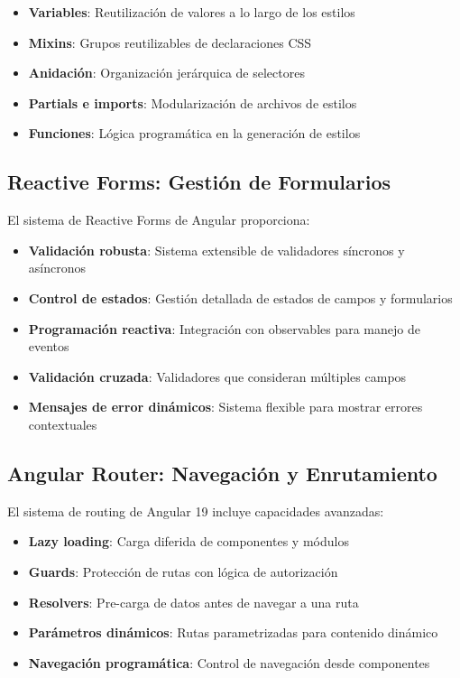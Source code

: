 \begin{itemize}
    \item \textbf{Variables}: Reutilización de valores a lo largo de los estilos
    \item \textbf{Mixins}: Grupos reutilizables de declaraciones CSS
    \item \textbf{Anidación}: Organización jerárquica de selectores
    \item \textbf{Partials e imports}: Modularización de archivos de estilos
    \item \textbf{Funciones}: Lógica programática en la generación de estilos
\end{itemize}

\subsection{Reactive Forms: Gestión de Formularios}

El sistema de Reactive Forms de Angular proporciona:

\begin{itemize}
    \item \textbf{Validación robusta}: Sistema extensible de validadores síncronos y asíncronos
    \item \textbf{Control de estados}: Gestión detallada de estados de campos y formularios
    \item \textbf{Programación reactiva}: Integración con observables para manejo de eventos
    \item \textbf{Validación cruzada}: Validadores que consideran múltiples campos
    \item \textbf{Mensajes de error dinámicos}: Sistema flexible para mostrar errores contextuales
\end{itemize}

\subsection{Angular Router: Navegación y Enrutamiento}

El sistema de routing de Angular 19 incluye capacidades avanzadas:

\begin{itemize}
    \item \textbf{Lazy loading}: Carga diferida de componentes y módulos
    \item \textbf{Guards}: Protección de rutas con lógica de autorización
    \item \textbf{Resolvers}: Pre-carga de datos antes de navegar a una ruta
    \item \textbf{Parámetros dinámicos}: Rutas parametrizadas para contenido dinámico
    \item \textbf{Navegación programática}: Control de navegación desde componentes
\end{itemize}

